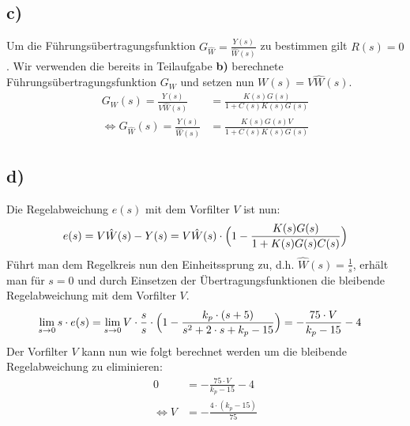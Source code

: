 \documentclass[11pt]{scrartcl} %
\begin{document}
\subsection*{c)}
Um die Führungsübertragungsfunktion $G_{\hat{W}}=\frac{Y(s)}{\hat{W}(s)}$ zu bestimmen gilt $R(s)=0$. Wir verwenden die bereits in Teilaufgabe \textbf{b)} berechnete Führungsübertragungsfunktion $G_W$ und setzen nun $W(s)=V\hat{W}(s)$.
\begin{align*}
	G_{W}(s)=\frac{Y(s)}{V\hat{W}(s)}&=\frac{K(s)G(s)}{1+C(s)K(s)G(s)}\\
	\Leftrightarrow G_{\hat{W}}(s)=\frac{Y(s)}{\hat{W}(s)}&=\frac{K(s)G(s)V}{1+C(s)K(s)G(s)}
\end{align*}
\subsection*{d)}
Die Regelabweichung $e(s)$ mit dem Vorfilter $V$ ist nun:
\begin{align*}
	e(s)=V\hat{W}(s)-Y(s)=V\hat{W}(s)\cdot\Bigl(1-\frac{K(s)G(s)}{1+K(s)G(s)C(s)}\Bigl)
\end{align*}
Führt man dem Regelkreis nun den Einheitssprung zu, d.h. $\hat{W}(s)=\frac{1}{s}$, erhält man für $s=0$ und durch Einsetzen der Übertragungsfunktionen die bleibende Regelabweichung mit dem Vorfilter $V$.
\begin{align*}
	\lim \limits_{s \to 0}s\cdot e(s)&=\lim \limits_{s \to 0}V\cdot\frac{s}{s}\cdot\Bigl(1-\frac{k_p\cdot(s+5)}{s^2+2\cdot s+k_p-15}\Bigr)=-\frac{75\cdot V}{k_p-15}-4
\end{align*}
Der Vorfilter $V$ kann nun wie folgt berechnet werden um die bleibende Regelabweichung zu eliminieren:
\begin{align*}
	0&=-\frac{75\cdot V}{k_p-15}-4\\
\Leftrightarrow V&=-\frac{4\cdot(k_p-15)}{75}
\end{align*}
\end{document}
